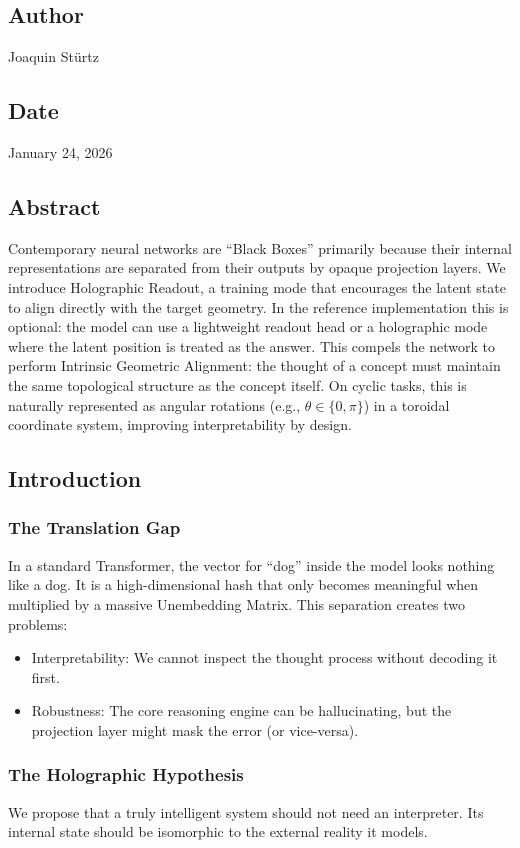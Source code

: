 \documentclass{article}
\numberwithin{equation}{section}
\begin{document}
\subsection*{Author}
Joaquin Stürtz
\subsection*{Date}
January 24, 2026
\subsection*{Abstract}
Contemporary neural networks are ``Black Boxes'' primarily because their internal representations are separated from their outputs by opaque projection layers. We introduce Holographic Readout, a training mode that encourages the latent state to align directly with the target geometry. In the reference implementation this is optional: the model can use a lightweight readout head or a holographic mode where the latent position is treated as the answer. This compels the network to perform Intrinsic Geometric Alignment: the thought of a concept must maintain the same topological structure as the concept itself. On cyclic tasks, this is naturally represented as angular rotations (e.g., $\theta \in \{0, \pi\}$) in a toroidal coordinate system, improving interpretability by design.

\subsection{Introduction}
\subsubsection{The Translation Gap}
In a standard Transformer, the vector for ``dog'' inside the model looks nothing like a dog. It is a high-dimensional hash that only becomes meaningful when multiplied by a massive Unembedding Matrix. This separation creates two problems:
\begin{itemize}
\item Interpretability: We cannot inspect the thought process without decoding it first.
\item Robustness: The core reasoning engine can be hallucinating, but the projection layer might mask the error (or vice-versa).
\end{itemize}

\subsubsection{The Holographic Hypothesis}
We propose that a truly intelligent system should not need an interpreter. Its internal state should be isomorphic to the external reality it models.
\end{document}
